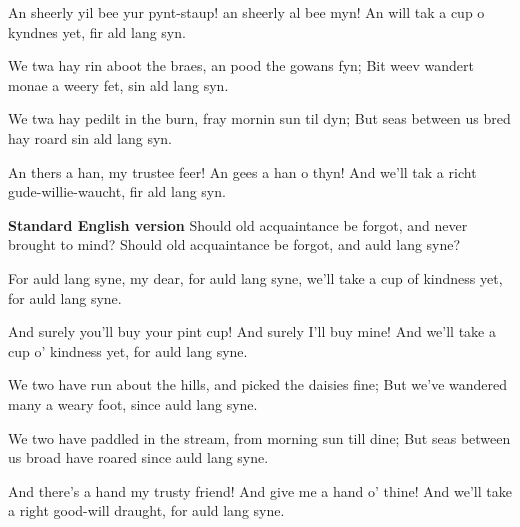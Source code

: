 \begin{guitar}
	An sheerly yil bee yur pynt-staup! an sheerly al bee myn!
	An will tak a cup o kyndnes yet, fir ald lang syn.
	
	We twa hay rin aboot the braes, an pood the gowans fyn;
	Bit weev wandert monae a weery fet, sin ald lang syn.
	
	We twa hay pedilt in the burn, fray mornin sun til dyn;
	But seas between us bred hay roard sin ald lang syn.
	
	An thers a han, my trustee feer! An gees a han o thyn!
	And we'll tak a richt gude-willie-waucht, fir ald lang syn.
	
	\hspace*{\fill} \textbf{Standard English version}
	Should old acquaintance be forgot, and never brought to mind?
	Should old acquaintance be forgot, and auld lang syne?
	
	\hspace*{10pt}
	\hspace*{10pt}For auld lang syne, my dear, for auld lang syne,
	\hspace*{10pt}we'll take a cup of kindness yet, for auld lang syne.
	
	And surely you'll buy your pint cup! And surely I'll buy mine!
	And we'll take a cup o' kindness yet, for auld lang syne.
	
	We two have run about the hills, and picked the daisies fine;
	But we've wandered many a weary foot, since auld lang syne.
	
	We two have paddled in the stream, from morning sun till dine;
	But seas between us broad have roared since auld lang syne.
	
	And there's a hand my trusty friend! And give me a hand o' thine!
	And we'll take a right good-will draught, for auld lang syne.
\end{guitar}